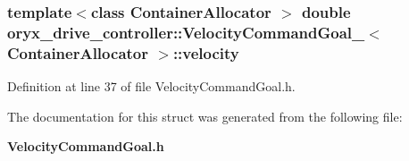 \subsubsection[{velocity}]{\setlength{\rightskip}{0pt plus 5cm}template$<$class Container\-Allocator $>$ double {\bf oryx\-\_\-drive\-\_\-controller\-::\-Velocity\-Command\-Goal\-\_\-}$<$ \-Container\-Allocator $>$\-::{\bf velocity}}\label{structoryx__drive__controller_1_1VelocityCommandGoal___a0064d4b6a1d54b863a08de07e8581dd8}


\-Definition at line 37 of file \-Velocity\-Command\-Goal.\-h.



\-The documentation for this struct was generated from the following file\-:\begin{DoxyCompactItemize}
\item 
{\bf \-Velocity\-Command\-Goal.\-h}\end{DoxyCompactItemize}

